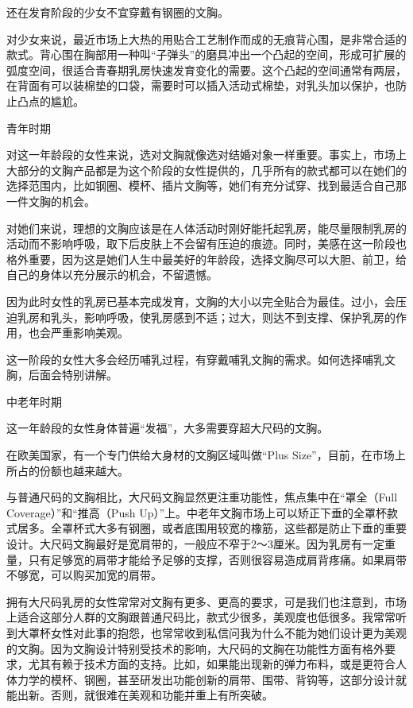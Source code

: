 \documentclass[12pt,UTF8]{ctexbook}
\begin{document}
还在发育阶段的少女不宜穿戴有钢圈的文胸。


对少女来说，最近市场上大热的用贴合工艺制作而成的无痕背心围，是非常合适的款式。背心围在胸部用一种叫“子弹头”的磨具冲出一个凸起的空间，形成可扩展的弧度空间，很适合青春期乳房快速发育变化的需要。这个凸起的空间通常有两层，在背面有可以装棉垫的口袋，需要时可以插入活动式棉垫，对乳头加以保护，也防止凸点的尴尬。

青年时期

对这一年龄段的女性来说，选对文胸就像选对结婚对象一样重要。事实上，市场上大部分的文胸产品都是为这个阶段的女性提供的，几乎所有的款式都可以在她们的选择范围内，比如钢圈、模杯、插片文胸等，她们有充分试穿、找到最适合自己那一件文胸的机会。

对她们来说，理想的文胸应该是在人体活动时刚好能托起乳房，能尽量限制乳房的活动而不影响呼吸，取下后皮肤上不会留有压迫的痕迹。同时，美感在这一阶段也格外重要，因为这是她们人生中最美好的年龄段，选择文胸尽可以大胆、前卫，给自己的身体以充分展示的机会，不留遗憾。

因为此时女性的乳房已基本完成发育，文胸的大小以完全贴合为最佳。过小，会压迫乳房和乳头，影响呼吸，使乳房感到不适；过大，则达不到支撑、保护乳房的作用，也会严重影响美观。

这一阶段的女性大多会经历哺乳过程，有穿戴哺乳文胸的需求。如何选择哺乳文胸，后面会特别讲解。

中老年时期

这一年龄段的女性身体普遍“发福”，大多需要穿超大尺码的文胸。

在欧美国家，有一个专门供给大身材的文胸区域叫做“Plus Size”，目前，在市场上所占的份额也越来越大。

与普通尺码的文胸相比，大尺码文胸显然更注重功能性，焦点集中在“罩全（Full Coverage）”和“推高（Push Up）”上。中老年文胸市场上可以矫正下垂的全罩杯款式居多。全罩杯式大多有钢圈，或者底围用较宽的橡筋，这些都是防止下垂的重要设计。大尺码文胸最好是宽肩带的，一般应不窄于2～3厘米。因为乳房有一定重量，只有足够宽的肩带才能给予足够的支撑，否则很容易造成肩背疼痛。如果肩带不够宽，可以购买加宽的肩带。



拥有大尺码乳房的女性常常对文胸有更多、更高的要求，可是我们也注意到，市场上适合这部分人群的文胸跟普通尺码比，款式少很多，美观度也低很多。我常常听到大罩杯女性对此事的抱怨，也常常收到私信问我为什么不能为她们设计更为美观的文胸。因为文胸设计特别受技术的影响，大尺码的文胸在功能性方面有格外要求，尤其有赖于技术方面的支持。比如，如果能出现新的弹力布料，或是更符合人体力学的模杯、钢圈，甚至研发出功能创新的肩带、围带、背钩等，这部分设计就能出新。否则，就很难在美观和功能并重上有所突破。
\end{document}
